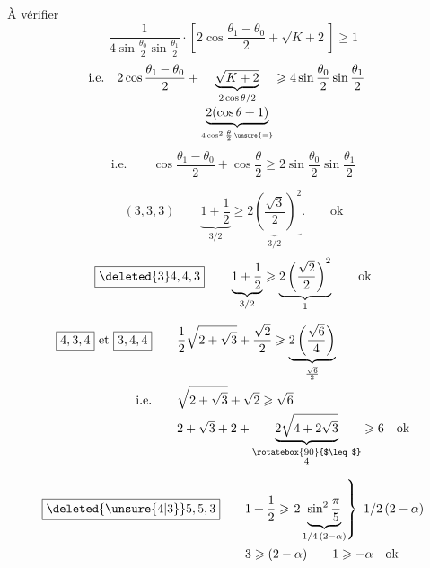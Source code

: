À vérifier
\[
\frac{1}{4\sin\frac{\theta_0}{2}\sin\frac{\theta_1}{2}}\cdot
\left[2\cos\frac{\theta_1-\theta_0}{2}+\sqrt{K+2}\right]\geqslant1
\]
\[
\begin{aligned}
\text{i.e.}\quad
2\cos\frac{\theta_1-\theta_0}2+
\underbrace{\sqrt{K+2}}_{\substack{2\cos\theta/2\\[2pt]
\underbrace{2(\cos\theta+1)}_{4\cos^2\frac\theta2\,\unsure{=}}}}
&\geqslant4\sin\frac{\theta_0}2\sin\frac{\theta_1}2
\end{aligned}
\]
\[
\text{i.e.}\qquad
\boxed{\cos\frac{\theta_1-\theta_0}{2}+\cos\frac\theta2\geqslant
2\sin\frac{\theta_0}{2}\sin\frac{\theta_1}{2}}
\]

\[
\boxed{(3,3,3)}\qquad \underbrace{1+\frac12}_{3/2}\geqslant
\underbrace{2\left(\frac{\sqrt3}{2}\right)^2}_{3/2}.\qquad\text{ok}
\]
\[
\boxed{\deleted{3}4,4,3}\qquad\underbrace{1+\frac12}_{3/2}
\geqslant\underbrace{2\left(\frac{\sqrt2}{2}\right)^2}_{1}\qquad\text{ok}
\]

\[
\begin{aligned}
\boxed{4,3,4}\ \text{et}\ \boxed{3,4,4}\qquad&
\frac12\sqrt{2+\sqrt3}+\frac{\sqrt2}{2}
\geqslant\underbrace{2\left(\frac{\sqrt6}{4}\right)}_{\frac{\sqrt6}{2}}\\
\text{i.e.}\qquad&\sqrt{2+\sqrt3}+\sqrt2\geqslant\sqrt6\\
&2+\sqrt3+2+\underbrace{2\sqrt{4+2\sqrt3}}_{\substack{\rotatebox{90}{$\leq$}\\4}}
\geqslant6\quad\text{ok}
\end{aligned}
\]

\[
\begin{aligned}
\boxed{\deleted{\unsure{4|3}}5,5,3}\qquad&
1+\frac12\geqslant\left.2\underbrace{\sin^2\frac\pi5}_{1/4\,(2-\alpha)}
\right\}\ 1/2\,(2-\alpha)\\
&3\geqslant(2-\alpha)\qquad1\geqslant-\alpha\quad\text{ok}
\end{aligned}
\]
